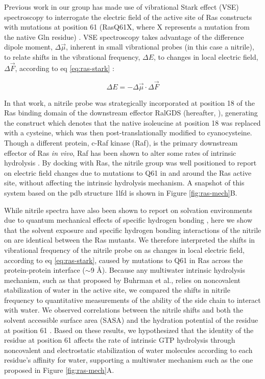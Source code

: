 Previous work in our group has made use of vibrational Stark effect (VSE) spectroscopy to interrogate the electric field of the active site of Ras constructs with mutations at position 61 (RasQ61X, where X represents a mutation from the native Gln residue) \cite{Stafford2012}.
VSE spectroscopy takes advantage of the difference dipole moment, $\Delta\vec{\mu}$, inherent in small vibrational probes (in this case a nitrile), to relate shifts in the vibrational frequency, $\Delta E$, to changes in local electric field, $\Delta\vec{F}$, according to eq \ref{eq:ras-stark} \cite{Andrews2000, Andrews2002, Fafarman2006, Fried2015, Slocum2018}:

\begin{equation}
\Delta E = - \Delta\vec{\mu}\cdot\Delta\vec{F}
\label{eq:ras-stark}
\end{equation}

In that work, a nitrile probe was strategically incorporated at position 18 of the Ras binding domain of the downstream effector RalGDS (hereafter, \RalB{}), generating the construct \RalBSCN{} which denotes that the native isoleucine at position 18 was replaced with a cysteine, which was then post-translationally modified to cyanocysteine. 
Though a different protein, c-Raf kinase (Raf), is the primary downstream effector of Ras \emph{in vivo}, Raf has been shown to alter some rates of intrinsic hydrolysis \cite{Buhrman2011}.
By docking \RalBSCN{} with Ras, the nitrile group was well positioned to report on electric field changes due to mutations to Q61 in and around the Ras active site, without affecting the intrinsic hydrolysis mechanism. 
A snapshot of this system based on the pdb structure 1lfd is shown in Figure \ref{fig:ras-mech}B.

While nitrile spectra have also been shown to report on solvation environments due to quantum mechanical effects of specific hydrogen bonding \cite{Waegele2009, Oh2008,Fafarman2010}, here we show that the solvent exposure and specific hydrogen bonding interactions of the nitrile on \RalBSCN{} are identical between the Ras mutants. 
We therefore interpreted the shifts in vibrational frequency of the nitrile probe on \RalB{} as changes in local electric field, according to eq \ref{eq:ras-stark}, caused by mutations to Q61 in Ras across the protein-protein interface ($\sim$9 \si{\angstrom}). 
Because any multiwater intrinsic hydrolysis mechanism, such as that proposed by Buhrman et al., relies on noncovalent stabilization of water in the active site, we compared the shifts in nitrile frequency to quantitative measurements of the ability of the side chain to interact with water. 
We observed correlations between the nitrile shifts and both the solvent accessible surface area (SASA) and the hydration potential of the residue at position 61 \cite{Stafford2012}.
Based on these results, we hypothesized that the identity of the residue at position 61 affects the rate of intrinsic GTP hydrolysis through noncovalent and electrostatic stabilization of water molecules according to each residue's affinity for water, supporting a multiwater mechanism such as the one proposed in Figure \ref{fig:ras-mech}A.


